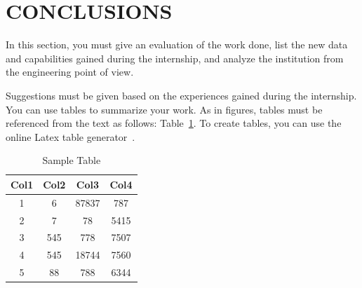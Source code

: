 \documentclass[12pt]{article}
\begin{document}
\section{CONCLUSIONS}
\label{sec-conclusion}
\par %
In this section, you must give an evaluation of the work done, 
list the new data and capabilities gained during the internship,  
and analyze the institution from the engineering point of view. 
\par %
Suggestions must be given based on the experiences gained 
during the internship. You can use tables to summarize your work.
As in figures, tables must be referenced from the text as follows:
Table~\ref{tbl-sample}. 
To create tables, you can use the online Latex table generator~\cite{ref-tablegenerator}. 
 
\begin{table}[h!]
   \centering
   \caption{Sample Table}
   \begin{tabular}{|c | c | c | c|} 
      \hline
      \textbf{Col1} & \textbf{Col2} & \textbf{Col3} & \textbf{Col4} \\ [0.5ex] 
      \hline
       1 & 6 & 87837 & 787 \\ 
      \hline
      2 & 7 & 78 & 5415 \\
      \hline
      3 & 545 & 778 & 7507 \\
      \hline
      4 & 545 & 18744 & 7560 \\
      \hline
      5 & 88 & 788 & 6344 \\ [1ex] 
      \hline
   \end{tabular}
   \label{tbl-sample}
\end{table}
\end{document}
